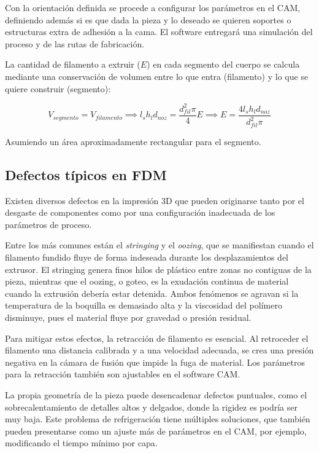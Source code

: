 Con la orientación definida se procede a configurar los parámetros en el CAM, definiendo además si es que dada la pieza y lo deseado se quieren soportes o estructuras extra de adhesión a la cama. El software entregará una simulación del proceso y de las rutas de fabricación. 

La cantidad de filamento a extruir ($E$) en cada segmento del cuerpo se calcula mediante una conservación de volumen entre lo que entra (filamento) y lo que se quiere construir (segmento):

\begin{equation}
	V_{segmento}=V_{filamento}\implies l_{s}h_{l}d_{noz}=\frac{d_{fil}^{2}\pi}{4}E\implies E= \frac{4 l_{s}h_{l}d_{noz}}{d_{fil}^{2} \pi}
\end{equation}

Asumiendo un área aproximadamente rectangular para el segmento.

\subsection{Defectos típicos en FDM}

Existen diversos defectos en la impresión 3D que pueden originarse tanto por el desgaste de componentes como por una configuración inadecuada de los parámetros de proceso. 

Entre los más comunes están el \textit{stringing} y el \textit{oozing}, que se manifiestan cuando el filamento fundido fluye de forma indeseada durante los desplazamientos del extrusor. El stringing genera finos hilos de plástico entre zonas no contiguas de la pieza, mientras que el oozing, o goteo, es la exudación continua de material cuando la extrusión debería estar detenida. Ambos fenómenos se agravan si la temperatura de la boquilla es demasiado alta y la viscosidad del polímero disminuye, pues el material fluye por gravedad o presión residual.

Para mitigar estos efectos, la retracción de filamento es esencial. Al retroceder el filamento una distancia calibrada y a una velocidad adecuada, se crea una presión negativa en la cámara de fusión que impide la fuga de material. Los parámetros para la retracción también son ajustables en el software CAM.

La propia geometría de la pieza puede desencadenar defectos puntuales, como el sobrecalentamiento de detalles altos y delgados, donde la rigidez es podría ser muy baja. Este problema de refrigeración tiene múltiples soluciones, que también pueden presentarse como un ajuste más de parámetros en el CAM, por ejemplo, modificando el tiempo mínimo por capa.


